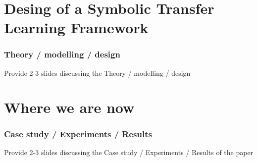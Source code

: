 \documentclass[presentation]{beamer}\mode<presentation>{\usetheme{blackAMSBolognaFC}}
\begin{document}
\section{Desing of a Symbolic Transfer Learning Framework}

\begin{frame}%
\frametitle{Theory / modelling / design}

    Provide 2-3 slides discussing the Theory / modelling / design

\end{frame}

\section{Where we are now}

\begin{frame}%
\frametitle{Case study / Experiments / Results}

    Provide 2-3 slides discussing the Case study / Experiments / Results of the paper

\end{frame}
\end{document}
